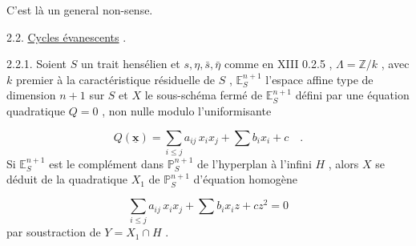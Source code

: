 \begin{center}
\end{center}
C'est là un general non-sense.

2.2.  \underline{Cycles évanescents} .

2.2.1.  Soient $S$ un trait hensélien et $s,\eta,\bar{s},\bar{\eta}$ comme en XIII 0.2.5 , $\Lambda = \mathbb{Z}/k$ , avec $k$ premier à la caractéristique résiduelle de $S$ , $\mathbb{E}^{n+1}_S$ l'espace affine type de dimension $n+1$ sur $S$ et $X$ le sous-schéma fermé de $\mathbb{E}^{n+1}_S$ défini par une équation quadratique $Q = 0$ , non nulle modulo l'uniformisante 



\begin{equation*}
 Q(\underline{\mathbf{x}}) = \sum_{i \leq j} a_{ij}\, x_i x_j + \sum b_i x_i + c \quad .
\end{equation*}
Si $\mathbb{E}^{n+1}_S$ est le complément dans $\mathbb{P}^{n+1}_S$ de l'hyperplan à l'infini $H$ , alors $X$ se déduit de la quadratique $X_1$ de $\mathbb{P}^{n+1}_S$ d'équation homogène

\begin{equation}\tag{2.2.1.1}
\sum_{i \leqslant j} a_{ij}\, x_i x_j + \sum b_i x_i z + cz^2 = 0
\end{equation}
par soustraction de $Y = X_1 \cap H$ .

